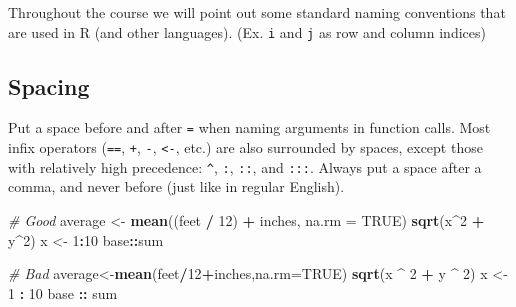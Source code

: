 \documentclass[]{book}
\newenvironment{Shaded}{\begin{snugshade}}{\end{snugshade}}
\newcommand{\KeywordTok}[1]{\textcolor[rgb]{0.13,0.29,0.53}{\textbf{#1}}}
\newcommand{\DataTypeTok}[1]{\textcolor[rgb]{0.13,0.29,0.53}{#1}}
\newcommand{\DecValTok}[1]{\textcolor[rgb]{0.00,0.00,0.81}{#1}}
\newcommand{\StringTok}[1]{\textcolor[rgb]{0.31,0.60,0.02}{#1}}
\newcommand{\CommentTok}[1]{\textcolor[rgb]{0.56,0.35,0.01}{\textit{#1}}}
\newcommand{\OtherTok}[1]{\textcolor[rgb]{0.56,0.35,0.01}{#1}}
\newcommand{\OperatorTok}[1]{\textcolor[rgb]{0.81,0.36,0.00}{\textbf{#1}}}
\newcommand{\NormalTok}[1]{#1}
\begin{document}
Throughout the course we will point out some standard naming conventions
that are used in R (and other languages). (Ex. \texttt{i} and \texttt{j}
as row and column indices)

\begin{Shaded}
\end{Shaded}

\subsection{Spacing}\label{spacing}

Put a space before and after \texttt{=} when naming arguments in
function calls. Most infix operators (\texttt{==}, \texttt{+},
\texttt{-}, \texttt{\textless{}-}, etc.) are also surrounded by spaces,
except those with relatively high precedence: \texttt{\^{}}, \texttt{:},
\texttt{::}, and \texttt{:::}. Always put a space after a comma, and
never before (just like in regular English).

\begin{Shaded}
\begin{Highlighting}[]
\CommentTok{# Good}
\NormalTok{average <-}\StringTok{ }\KeywordTok{mean}\NormalTok{((feet }\OperatorTok{/}\StringTok{ }\DecValTok{12}\NormalTok{) }\OperatorTok{+}\StringTok{ }\NormalTok{inches, }\DataTypeTok{na.rm =} \OtherTok{TRUE}\NormalTok{)}
\KeywordTok{sqrt}\NormalTok{(x}\OperatorTok{^}\DecValTok{2} \OperatorTok{+}\StringTok{ }\NormalTok{y}\OperatorTok{^}\DecValTok{2}\NormalTok{)}
\NormalTok{x <-}\StringTok{ }\DecValTok{1}\OperatorTok{:}\DecValTok{10}
\NormalTok{base}\OperatorTok{::}\NormalTok{sum}

\CommentTok{# Bad}
\NormalTok{average<-}\KeywordTok{mean}\NormalTok{(feet}\OperatorTok{/}\DecValTok{12}\OperatorTok{+}\NormalTok{inches,}\DataTypeTok{na.rm=}\OtherTok{TRUE}\NormalTok{)}
\KeywordTok{sqrt}\NormalTok{(x }\OperatorTok{^}\StringTok{ }\DecValTok{2} \OperatorTok{+}\StringTok{ }\NormalTok{y }\OperatorTok{^}\StringTok{ }\DecValTok{2}\NormalTok{)}
\NormalTok{x <-}\StringTok{ }\DecValTok{1} \OperatorTok{:}\StringTok{ }\DecValTok{10}
\NormalTok{base }\OperatorTok{::}\StringTok{ }\NormalTok{sum}
\end{Highlighting}
\end{Shaded}
\end{document}

